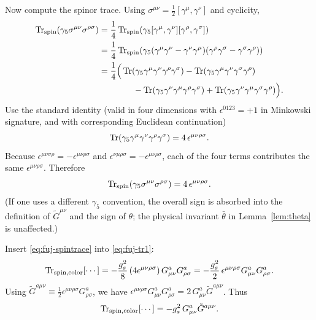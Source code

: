 \documentclass[11pt]{article}
\theoremstyle{remark}
\begin{document}
Now compute the spinor trace. Using $\sigma^{\mu\nu}=\tfrac12[\gamma^\mu,\gamma^\nu]$ and cyclicity,
\begin{align}
\Tr_{\mathrm{spin}}\!\left(\gamma_5\sigma^{\mu\nu}\sigma^{\rho\sigma}\right)
&=\frac14 \Tr_{\mathrm{spin}}\!\left(\gamma_5[\gamma^\mu,\gamma^\nu][\gamma^\rho,\gamma^\sigma]\right)\nonumber\\
&=\frac14\Tr_{\mathrm{spin}}\!\left(\gamma_5(\gamma^\mu\gamma^\nu-\gamma^\nu\gamma^\mu)(\gamma^\rho\gamma^\sigma-\gamma^\sigma\gamma^\rho)\right)\nonumber\\
&=\frac14\Big(
\Tr(\gamma_5\gamma^\mu\gamma^\nu\gamma^\rho\gamma^\sigma)
-\Tr(\gamma_5\gamma^\mu\gamma^\nu\gamma^\sigma\gamma^\rho)\nonumber\\
&\qquad\qquad
-\Tr(\gamma_5\gamma^\nu\gamma^\mu\gamma^\rho\gamma^\sigma)
+\Tr(\gamma_5\gamma^\nu\gamma^\mu\gamma^\sigma\gamma^\rho)
\Big).
\end{align}
Use the standard identity (valid in four dimensions with $\epsilon^{0123}=+1$ in Minkowski signature,
and with corresponding Euclidean continuation)
\begin{equation}\label{eq:fuj-tr5}
\Tr(\gamma_5\gamma^\mu\gamma^\nu\gamma^\rho\gamma^\sigma)=4\,\epsilon^{\mu\nu\rho\sigma}.
\end{equation}
Because $\epsilon^{\mu\nu\sigma\rho}=-\epsilon^{\mu\nu\rho\sigma}$ and
$\epsilon^{\nu\mu\rho\sigma}=-\epsilon^{\mu\nu\rho\sigma}$, each of the four terms contributes the same
$\epsilon^{\mu\nu\rho\sigma}$. Therefore
\begin{equation}\label{eq:fuj-spintrace}
\Tr_{\mathrm{spin}}\!\left(\gamma_5\sigma^{\mu\nu}\sigma^{\rho\sigma}\right)
=
4\,\epsilon^{\mu\nu\rho\sigma}.
\end{equation}
(If one uses a different $\gamma_5$ convention, the overall sign is absorbed into the definition of
$\tilde G^{\mu\nu}$ and the sign of $\theta$; the physical invariant $\bar\theta$ in Lemma~\ref{lem:theta}
is unaffected.)

Insert \eqref{eq:fuj-spintrace} into \eqref{eq:fuj-tr1}:
\begin{equation}\label{eq:fuj-tr2}
\Tr_{\mathrm{spin,color}}[\cdots]
=
-\frac{g_s^2}{8}\,(4\epsilon^{\mu\nu\rho\sigma})\,G_{\mu\nu}^a G_{\rho\sigma}^a
=
-\frac{g_s^2}{2}\,\epsilon^{\mu\nu\rho\sigma}G_{\mu\nu}^a G_{\rho\sigma}^a.
\end{equation}
Using $\tilde G^{a\mu\nu}\equiv \tfrac12\epsilon^{\mu\nu\rho\sigma}G_{\rho\sigma}^a$, we have
$\epsilon^{\mu\nu\rho\sigma}G_{\mu\nu}^a G_{\rho\sigma}^a = 2\,G_{\mu\nu}^a\tilde G^{a\mu\nu}$.
Thus
\begin{equation}\label{eq:fuj-tr3}
\Tr_{\mathrm{spin,color}}[\cdots]
=
- g_s^2\,G_{\mu\nu}^a\tilde G^{a\mu\nu}.
\end{equation}
\end{document}
